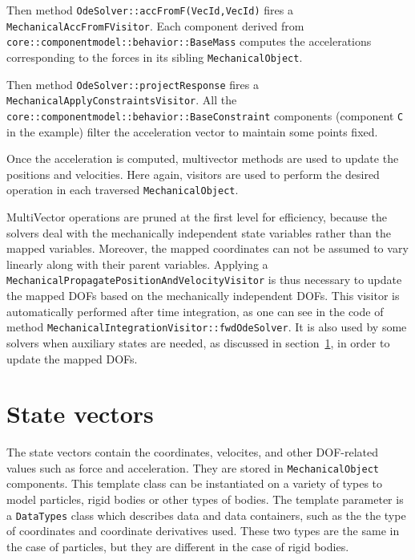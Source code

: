 Then method \texttt{OdeSolver::accFromF(VecId,VecId)} fires a \texttt{MechanicalAccFromFVisitor}. 
Each component derived from \texttt{core::componentmodel::behavior::BaseMass} computes the accelerations corresponding to the forces in its sibling \texttt{MechanicalObject}.

Then method \texttt{OdeSolver::projectResponse} fires a \texttt{MechanicalApplyConstraintsVisitor}. 
All the \texttt{core::componentmodel::behavior::BaseConstraint} components (component \texttt{C} in the example) filter the acceleration vector to maintain some points fixed.

Once the acceleration is computed, multivector methods are used to update the positions and velocities. 
Here again, visitors are used to perform the desired operation in each traversed \texttt{MechanicalObject}.

MultiVector operations are pruned at the first level for efficiency, because the solvers deal with the mechanically independent state variables rather than the mapped variables.
Moreover, the mapped coordinates can not be assumed to vary linearly along with their parent variables.
Applying a \\ \texttt{MechanicalPropagatePositionAndVelocityVisitor} is thus necessary to update the mapped DOFs based on the mechanically independent DOFs.
This visitor is automatically performed after time integration, as one can see in the code of method \texttt{MechanicalIntegrationVisitor::fwdOdeSolver}.
It is also used by some solvers when auxiliary states are needed, as discussed in section~\ref{sec:statevectors}, in order to update the mapped DOFs.



\section{State vectors} \label{sec:statevectors}
The state vectors contain the coordinates, velocites, and other DOF-related values such as force and acceleration.
They are stored in \texttt{MechanicalObject} components.
This template class can be instantiated on a variety of types to model particles, rigid bodies or other types of bodies.
The template parameter is a \texttt{DataTypes} class which describes data and data containers, such as the the type of coordinates and coordinate derivatives used.
These two types are the same in the case of particles, but they are different in the case of rigid bodies.

